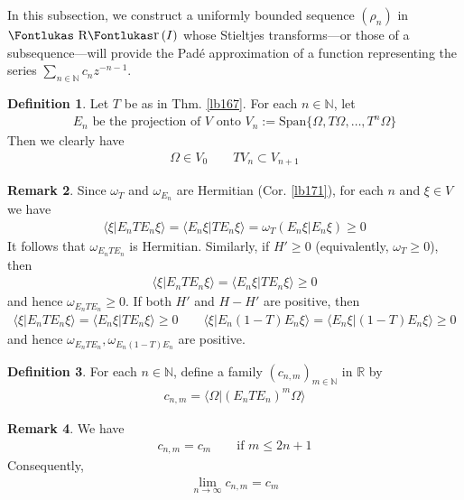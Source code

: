 \documentclass[12pt,b5paper,notitlepage]{article}
\theoremstyle{definition}
\newtheorem{df}{Definition}[subsection]
\newtheorem{rem}[df]{Remark}
\theoremstyle{plain}
\DeclareMathOperator{\Rr}{\text{\Fontlukas R}\text{\kern -0pt {\Fontlukas\large r}}\,}
\newcommand{\Span}{\mathrm{Span}}
\newcommand{\bk}[1]{\langle {#1}\rangle}
\newcommand{\Nbb}{\mathbb N}
\newcommand{\Rbb}{\mathbb R}
\numberwithin{equation}{section}
\begin{document}
In this subsection, we construct a uniformly bounded sequence $(\rho_n)$ in $\Rr (I)$ whose Stieltjes transforms---or those of a subsequence---will provide the Pad\'e approximation of a function representing the series $\sum_{n\in\Nbb}c_nz^{-n-1}$.

\begin{df}\label{lb189}
Let $T$ be as in Thm. \ref{lb167}. For each $n\in\Nbb$, let
\begin{align*}
E_n\text{ be the projection of $V$ onto }V_n:=\Span\{\Omega,T\Omega,\dots,T^n\Omega\}
\end{align*}
Then we clearly have
\begin{align}\label{eq84}
\Omega\in V_0\qquad TV_n\subset V_{n+1}
\end{align}
\end{df}



\begin{rem}\label{lb173}
Since $\omega_T$ and $\omega_{E_n}$ are Hermitian (Cor. \ref{lb171}), for each $n$ and $\xi\in V$ we have
\begin{align*}
\bk{\xi|E_nTE_n\xi}=\bk{E_n\xi|TE_n\xi}=\omega_T(E_n\xi|E_n\xi)\geq0
\end{align*}
It follows that $\omega_{E_nTE_n}$ is Hermitian. Similarly, if $H'\geq0$ (equivalently, $\omega_T\geq0$), then
\begin{align*}
\bk{\xi|E_nTE_n\xi}=\bk{E_n\xi|TE_n\xi}\geq0
\end{align*}
and hence $\omega_{E_nTE_n}\geq0$. If both $H'$ and $H-H'$ are positive, then 
\begin{align*}
\bk{\xi|E_nTE_n\xi}=\bk{E_n\xi|TE_n\xi}\geq0\qquad\bk{\xi|E_n(1-T)E_n\xi}=\bk{E_n\xi|(1-T)E_n\xi}\geq0
\end{align*}
and hence $\omega_{E_nTE_n},\omega_{E_n(1-T)E_n}$ are positive.
\end{rem}


\begin{df}
For each $n\in\Nbb$, define a family $(c_{n,m})_{m\in\Nbb}$ in $\Rbb$ by
\begin{align}
c_{n,m}=\bk{\Omega|(E_nTE_n)^m\Omega}
\end{align}
\end{df}

\begin{rem}\label{lb185}
We have
\begin{align}\label{eq83}
c_{n,m}=c_m\qquad\text{if }m\leq 2n+1
\end{align}
Consequently,
\begin{align}\label{eq90}
\lim_{n\rightarrow\infty}c_{n,m}=c_m
\end{align}
\end{rem}
\end{document}
